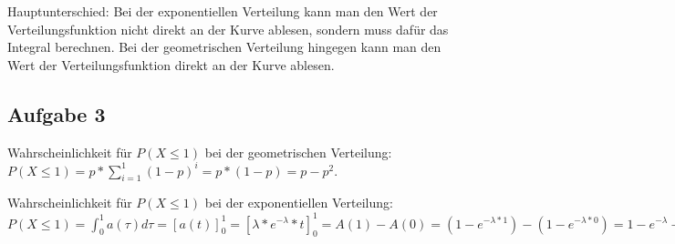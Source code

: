 \documentclass[%
10pt,              %
ngerman,           %
a4paper,           %
DIV11,             %
]{scrartcl}%
\begin{document}
\noindent
Hauptunterschied: Bei der exponentiellen Verteilung kann man den Wert der Verteilungsfunktion nicht direkt an der Kurve ablesen, sondern muss dafür das Integral berechnen. Bei der geometrischen Verteilung hingegen kann man den Wert der Verteilungsfunktion direkt an der Kurve ablesen. 

\subsection*{Aufgabe 3}

Wahrscheinlichkeit für $P(X \leq 1)$ bei der geometrischen Verteilung:\newline
$P(X \leq 1) = p * \sum_{i = 1}^{1} (1-p)^i = p * (1-p) = p - p^2$.\newline

Wahrscheinlichkeit für $P(X \leq 1)$ bei der exponentiellen Verteilung:\newline
$P(X \leq 1) = \int_{0}^{1} a(\tau) d\tau = [a(t)]_0^1 = [\lambda * e^{-\lambda} * t]_0^1 = A(1) - A(0) = (1 - e^{-\lambda * 1}) - (1 - e^{-\lambda * 0}) = 1 - e^{-\lambda} - 1 + 1 = 1 - e^{- \lambda}$ 
\end{document}
